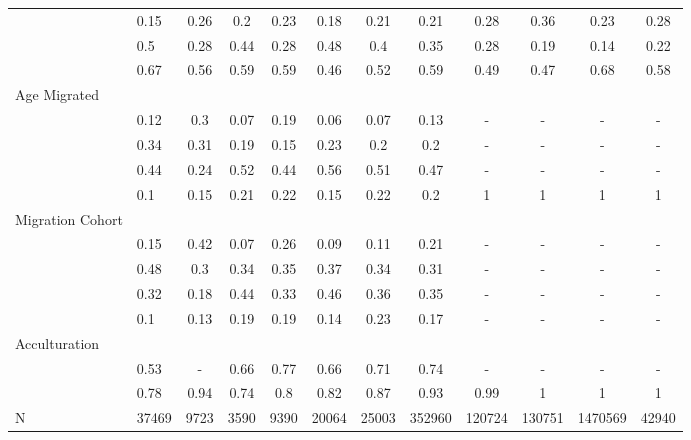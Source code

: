 \begin{table}[ht]
\begin{tabular}{>{\raggedright\arraybackslash}p{3.2cm}|lcccccc|cccc}
  \multicolumn{1}{>{\raggedleft\arraybackslash}p{2.2cm}|}{\makebox[2.2cm][r]{Lives Alone }}& 0.15 & 0.26 & 0.2 & 0.23 & 0.18 & 0.21 & 0.21 & 0.28 & 0.36 & 0.23 & 0.28 \\ 
  \multicolumn{1}{>{\raggedleft\arraybackslash}p{2.9cm}|}{\makebox[2.9cm][r]{Lives with Child }}& 0.5 & 0.28 & 0.44 & 0.28 & 0.48 & 0.4 & 0.35 & 0.28 & 0.19 & 0.14 & 0.22 \\ 
  \multicolumn{1}{>{\raggedleft\arraybackslash}p{3.4cm}|}{\makebox[3.4cm][r]{Married/Cohabiting }}& 0.67 & 0.56 & 0.59 & 0.59 & 0.46 & 0.52 & 0.59 & 0.49 & 0.47 & 0.68 & 0.58 \\ 
  Age Migrated &  &  &  &  &  &  &  &  &  &  &  \\ 
  \multicolumn{1}{>{\raggedleft\arraybackslash}p{2.4cm}|}{\makebox[2.4cm][r]{Less than 15 }}& 0.12 & 0.3 & 0.07 & 0.19 & 0.06 & 0.07 & 0.13 & - & - & - & - \\ 
  \multicolumn{1}{>{\raggedleft\arraybackslash}p{1.6cm}|}{\makebox[1.6cm][r]{15 - 23 }}& 0.34 & 0.31 & 0.19 & 0.15 & 0.23 & 0.2 & 0.2 & - & - & - & - \\ 
  \multicolumn{1}{>{\raggedleft\arraybackslash}p{1.6cm}|}{\makebox[1.6cm][r]{24 - 49 }}& 0.44 & 0.24 & 0.52 & 0.44 & 0.56 & 0.51 & 0.47 & - & - & - & - \\ 
  \multicolumn{1}{>{\raggedleft\arraybackslash}p{2.6cm}|}{\makebox[2.6cm][r]{50 and Above }}& 0.1 & 0.15 & 0.21 & 0.22 & 0.15 & 0.22 & 0.2 & 1 & 1 & 1 & 1 \\ 
  Migration Cohort &  &  &  &  &  &  &  &  &  &  &  \\ 
  \multicolumn{1}{>{\raggedleft\arraybackslash}p{2.3cm}|}{\makebox[2.3cm][r]{Before 1965 }}& 0.15 & 0.42 & 0.07 & 0.26 & 0.09 & 0.11 & 0.21 & - & - & - & - \\ 
  \multicolumn{1}{>{\raggedleft\arraybackslash}p{2.2cm}|}{\makebox[2.2cm][r]{1965 - 1979 }}& 0.48 & 0.3 & 0.34 & 0.35 & 0.37 & 0.34 & 0.31 & - & - & - & - \\ 
  \multicolumn{1}{>{\raggedleft\arraybackslash}p{2.2cm}|}{\makebox[2.2cm][r]{1980 - 1999 }}& 0.32 & 0.18 & 0.44 & 0.33 & 0.46 & 0.36 & 0.35 & - & - & - & - \\ 
  \multicolumn{1}{>{\raggedleft\arraybackslash}p{2.1cm}|}{\makebox[2.1cm][r]{After 1999 }}& 0.1 & 0.13 & 0.19 & 0.19 & 0.14 & 0.23 & 0.17 & - & - & - & - \\ 
  Acculturation &  &  &  &  &  &  &  &  &  &  &  \\ 
  \multicolumn{1}{>{\raggedleft\arraybackslash}p{1.6cm}|}{\makebox[1.6cm][r]{Citizen }}& 0.53 & - & 0.66 & 0.77 & 0.66 & 0.71 & 0.74 & - & - & - & - \\ 
  \multicolumn{1}{>{\raggedleft\arraybackslash}p{3cm}|}{\makebox[3cm][r]{English Speakers }}& 0.78 & 0.94 & 0.74 & 0.8 & 0.82 & 0.87 & 0.93 & 0.99 & 1 & 1 & 1 \\ 
  N & 37469 & 9723 & 3590 & 9390 & 20064 & 25003 & 352960 & 120724 & 130751 & 1470569 & 42940 \\ 
   \hline
\end{tabular}
\endgroup
\end{table}
